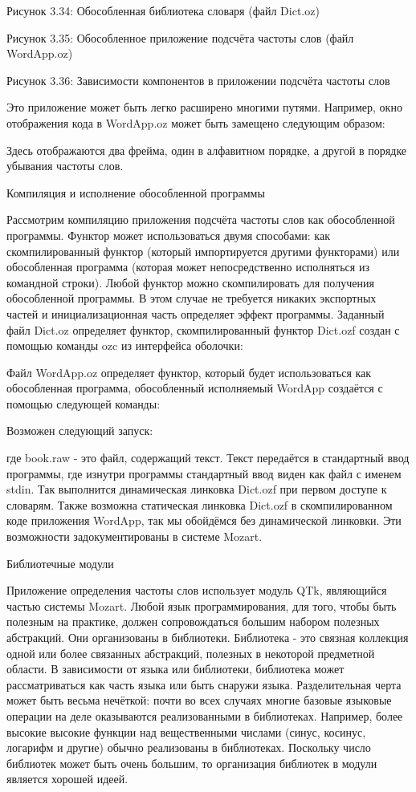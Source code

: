 Рисунок 3.34: Обособленная библиотека словаря (файл Dict.oz)

Рисунок 3.35: Обособленное приложение подсчёта частоты слов (файл WordApp.oz)

Рисунок 3.36: Зависимости компонентов в приложении подсчёта частоты слов

Это приложение может быть легко расширено многими путями. Например, окно отображения кода в WordApp.oz может быть замещено следующим образом:

Здесь отображаются два фрейма, один в алфавитном порядке, а другой в порядке убывания частоты слов.

Компиляция и исполнение обособленной программы

Рассмотрим компиляцию приложения подсчёта частоты слов как обособленной программы. Функтор может использоваться двумя способами: как скомпилированный функтор (который импортируется другими функторами) или обособленная программа (которая может непосредственно исполняться из командной строки). Любой функтор можно скомпилировать для получения обособленной программы. В этом случае не требуется никаких экспортных частей и инициализационная часть определяет эффект программы. Заданный файл Dict.oz определяет функтор, скомпилированный функтор Dict.ozf создан с помощью команды ozc из интерфейса оболочки:

Файл WordApp.oz определяет функтор, который будет использоваться как обособленная программа, обособленный исполняемый WordApp создаётся с помощью следующей команды:

Возможен следующий запуск:

где book.raw - это файл, содержащий текст. Текст передаётся в стандартный ввод программы, где изнутри программы стандартный ввод виден как файл с именем stdin. Так выполнится динамическая линковка Dict.ozf при первом доступе к словарям. Также возможна статическая линковка Dict.ozf в скомпилированном коде приложения WordApp, так мы обойдёмся без динамической линковки. Эти возможности задокументированы в системе Mozart.

Библиотечные модули

Приложение определения частоты слов использует модуль QTk, являющийся частью системы Mozart. Любой язык программирования, для того, чтобы быть полезным на практике, должен сопровождаться большим набором полезных абстракций. Они организованы в библиотеки. Библиотека - это связная коллекция одной или более связанных абстракций, полезных в некоторой предметной области. В зависимости от языка или библиотеки, библиотека может рассматриваться как часть языка или быть снаружи языка. Разделительная черта может быть весьма нечёткой: почти во всех случаях многие базовые языковые операции на деле оказываются реализованными в библиотеках. Например, более высокие высокие функции над вещественными числами (синус, косинус, логарифм и другие) обычно реализованы в библиотеках. Поскольку число библиотек может быть очень большим, то организация библиотек в модули является хорошей идеей.


